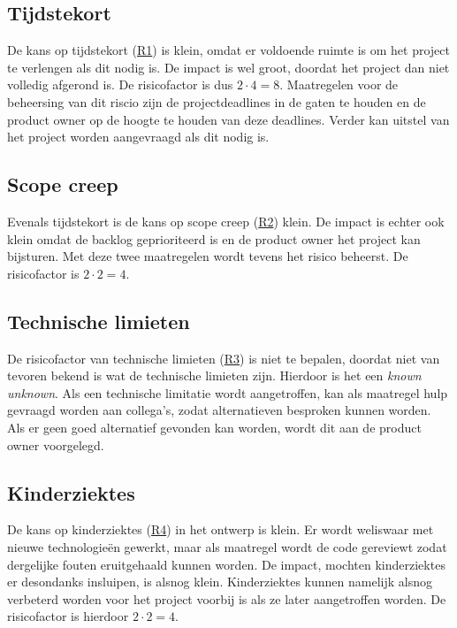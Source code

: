 \documentclass[../report.tex]{subfiles}
\begin{document}
\subsection{Tijdstekort}

De kans op tijdstekort (\hyperref[itm:R1]{R1}) is klein, omdat er voldoende ruimte is om het project te verlengen als dit nodig is. De impact is wel groot, doordat het project dan niet volledig afgerond is. De risicofactor is dus $2 \cdot 4 = 8$. Maatregelen voor de beheersing van dit riscio zijn de projectdeadlines in de gaten te houden en de \gls*{product owner} op de hoogte te houden van deze deadlines. Verder kan uitstel van het project worden aangevraagd als dit nodig is.

\subsection{Scope creep}

Evenals tijdstekort is de kans op scope creep (\hyperref[itm:R2]{R2}) klein. De impact is echter ook klein omdat de backlog geprioriteerd is en de \gls*{product owner} het project kan bijsturen. Met deze twee maatregelen wordt tevens het risico beheerst. De risicofactor is $2 \cdot 2 = 4$.

\subsection{Technische limieten}

De risicofactor van technische limieten (\hyperref[itm:R3]{R3}) is niet te bepalen, doordat niet van tevoren bekend is wat de technische limieten zijn. Hierdoor is het een \textit{known unknown}. Als een technische limitatie wordt aangetroffen, kan als maatregel hulp gevraagd worden aan collega's, zodat alternatieven besproken kunnen worden. Als er geen goed alternatief gevonden kan worden, wordt dit aan de \gls*{product owner} voorgelegd.

\subsection{Kinderziektes}

De kans op kinderziektes (\hyperref[itm:R4]{R4}) in het ontwerp is klein. Er wordt weliswaar met nieuwe technologieën gewerkt, maar als maatregel wordt de code gereviewt zodat dergelijke fouten eruitgehaald kunnen worden. De impact, mochten kinderziektes er desondanks insluipen, is alsnog klein. Kinderziektes kunnen namelijk alsnog verbeterd worden voor het project voorbij is als ze later aangetroffen worden. De risicofactor is hierdoor $2 \cdot 2 = 4$.


\end{document}
